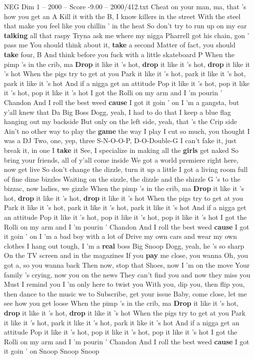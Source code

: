 \begin{textsample}{NEG Dim 1 – 2000 – Score -9.00 – 2000/412.txt}
Cheat on your man, ma, that 's how you get an A Kill it with the B, I know killers in the street With the steel that make you feel like you chillin ' in the heat So don't try to run up on my ear \textbf{talking} all that raspy Tryna ask me where my nigga Pharrell got his chain, gon ' pass me You should think about it, \textbf{take} a second Matter of fact, you should \textbf{take} four, B And think before you fuck with a little skateboard P When the pimp 's in the crib, ma \textbf{Drop} it like it 's hot, \textbf{drop} it like it 's hot, \textbf{drop} it like it 's hot When the pigs try to get at you Park it like it 's hot, park it like it 's hot, park it like it 's hot And if a nigga get an attitude Pop it like it 's hot, pop it like it 's hot, pop it like it 's hot I got the Rolli on my arm and I 'm pourin ' Chandon And I roll the best weed \textbf{cause} I got it goin ' on I 'm a gangsta, but y'all knew that Da Big Boss Dogg, yeah, I had to do that I keep a blue flag hanging out my backside But only on the left side, yeah, that 's the Crip side Ain't no other way to play the \textbf{game} the way I play I cut so much, you thought I was a DJ Two, one, yep, three S-N-O-O-P, D-O-Double-G I can't fake it, just break it, in one I \textbf{take} it See, I specialize in making all the \textbf{girls} get naked So bring your friends, all of y'all come inside We got a world premiere right here, now get live So don't change the dizzle, turn it up a little I got a living room full of fine dime bizzles Waiting on the sizzle, the dizzle and the shizzle G 's to the bizzac, now ladies, we gizzle When the pimp 's in the crib, ma \textbf{Drop} it like it 's hot, \textbf{drop} it like it 's hot, \textbf{drop} it like it 's hot When the pigs try to get at you Park it like it 's hot, park it like it 's hot, park it like it 's hot And if a nigga get an attitude Pop it like it 's hot, pop it like it 's hot, pop it like it 's hot I got the Rolli on my arm and I 'm pourin ' Chandon And I roll the best weed \textbf{cause} I got it goin ' on I 'm a bad boy with a lot of Drive my own cars and wear my own clothes I hang out tough, I 'm a \textbf{real} boss Big Snoop Dogg, yeah, he 's so sharp On the TV screen and in the magazines If you \textbf{pay} me close, you wanna Oh, you got a, so you wanna back Then now, stop that Shoes, now I 'm on the move Your family 's crying, now you on the news They can't find you and now they miss you Must I remind you I 'm only here to twist you With you, dip you, then flip you, then dance to the music we to Subscribe, get your issue Baby, come close, let me see how you get loose When the pimp 's in the crib, ma \textbf{Drop} it like it 's hot, \textbf{drop} it like it 's hot, \textbf{drop} it like it 's hot When the pigs try to get at you Park it like it 's hot, park it like it 's hot, park it like it 's hot And if a nigga get an attitude Pop it like it 's hot, pop it like it 's hot, pop it like it 's hot I got the Rolli on my arm and I 'm pourin ' Chandon And I roll the best weed \textbf{cause} I got it goin ' on Snoop Snoop Snoop

\end{textsample}
